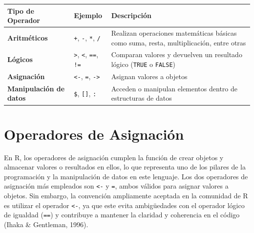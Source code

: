 \documentclass[
  spanish,
  a4paper,
  DIV=11,
  numbers=noendperiod,
  onepage,
  openany]{scrreprt}
\begin{document}
\begin{longtable}[]{@{}
  >{\raggedright\arraybackslash}p{}
  >{\raggedright\arraybackslash}p{}
  >{\raggedright\arraybackslash}p{}@{}}
\toprule\noalign{}
\begin{minipage}[b]{\linewidth}\raggedright
\textbf{Tipo de Operador}
\end{minipage} & \begin{minipage}[b]{\linewidth}\raggedright
\textbf{Ejemplo}
\end{minipage} & \begin{minipage}[b]{\linewidth}\raggedright
\textbf{Descripción}
\end{minipage} \\
\midrule\noalign{}
\endhead
\bottomrule\noalign{}
\endlastfoot
\textbf{Aritméticos} & \texttt{+}, \texttt{-}, \texttt{*}, \texttt{/} &
Realizan operaciones matemáticas básicas como suma, resta,
multiplicación, entre otras \\
\textbf{Lógicos} & \texttt{\textgreater{}}, \texttt{\textless{}},
\texttt{==}, \texttt{!=} & Comparan valores y devuelven un resultado
lógico (\texttt{TRUE} o \texttt{FALSE}) \\
\textbf{Asignación} & \texttt{\textless{}-}, \texttt{=},
\texttt{-\textgreater{}} & Asignan valores a objetos \\
\textbf{Manipulación de datos} & \texttt{\$}, \texttt{{[}{]}},
\texttt{:} & Acceden o manipulan elementos dentro de estructuras de
datos \\
\end{longtable}

\section{Operadores de Asignación}\label{operadores-de-asignaciuxf3n}

En R, los operadores de asignación cumplen la función de crear objetos y
almacenar valores o resultados en ellos, lo que representa uno de los
pilares de la programación y la manipulación de datos en este lenguaje.
Los dos operadores de asignación más empleados son \texttt{\textless{}-}
y \texttt{=}, ambos válidos para asignar valores a objetos. Sin embargo,
la convención ampliamente aceptada en la comunidad de R es utilizar el
operador \texttt{\textless{}-}, ya que este evita ambigüedades con el
operador lógico de igualdad (\texttt{==}) y contribuye a mantener la
claridad y coherencia en el código (Ihaka \& Gentleman, 1996).
\end{document}
